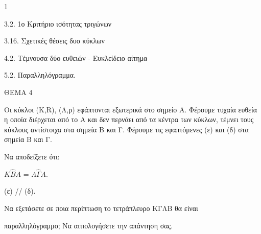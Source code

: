\begin{ylh}{1}
    \item 3.2. 1ο Κριτήριο ισότητας τριγώνων
    \item 3.16. Σχετικές θέσεις δυο κύκλων
    \item 4.2. Τέμνουσα δύο ευθειών - Ευκλείδειο αίτημα
    \item 5.2. Παραλληλόγραμμα.
\end{ylh}

ΘΕΜΑ 4

Οι κύκλοι (Κ,R), (Λ,ρ) εφάπτονται εξωτερικά στο σημείο Α. Φέρουμε τυχαία ευθεία η οποία διέρχεται από το Α και δεν περνάει από τα κέντρα των κύκλων, τέμνει τους κύκλους αντίστοιχα στα σημεία Β και Γ. Φέρουμε τις εφαπτόμενες (ε) και (δ) στα σημεία Β και Γ.

Να αποδείξετε ότι:

\begin{alist}
\item $Κ\widehat{Β}Α$ = $\Lambda\widehat{\Gamma}Α$. 

\item (ε) // (δ). 

\item Να εξετάσετε σε ποια περίπτωση το τετράπλευρο ΚΓΛΒ θα είναι

παραλληλόγραμμο; Να αιτιολογήσετε την απάντηση σας. 


\begin{center}
\end{center}
\end{alist}
